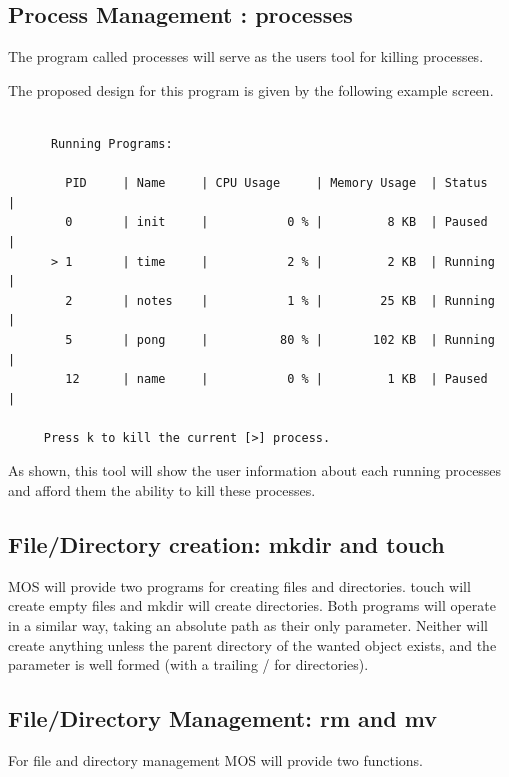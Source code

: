 \documentclass[a4paper]{report}
\begin{document}
\subsection{Process Management : processes}

The program called processes will serve as the users tool for killing processes.

The proposed design for this program is given by the following example screen.

{\ttfamily \small
  \begin{framed}
    \begin{verbatim}

      Running Programs:

        PID     | Name     | CPU Usage     | Memory Usage  | Status     |
        0       | init     |           0 % |         8 KB  | Paused     |
      > 1       | time     |           2 % |         2 KB  | Running    |
        2       | notes    |           1 % |        25 KB  | Running    |
        5       | pong     |          80 % |       102 KB  | Running    |
        12      | name     |           0 % |         1 KB  | Paused     |

     Press k to kill the current [>] process.

    \end{verbatim}
  \end{framed}
}

As shown, this tool will show the user information about each running processes and afford them the ability to kill these processes.

\subsection{File/Directory creation: mkdir and touch}

MOS will provide two programs for creating files and directories. touch will create empty files and mkdir will create directories. Both programs will operate in a similar way, taking an absolute path as their only parameter. Neither will create anything unless the parent directory of the wanted object exists, and the parameter is well formed (with a trailing / for directories).

\subsection{File/Directory Management: rm and mv}

For file and directory management MOS will provide two functions.
\end{document}
